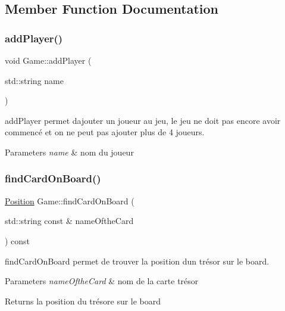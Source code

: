 \subsection{Member Function Documentation}
\mbox{\label{class_game_a99198ff9faa792eeea8b24435e34cd6d}} 
\subsubsection{\texorpdfstring{addPlayer()}{addPlayer()}}
{\footnotesize\ttfamily void Game\+::add\+Player (\begin{DoxyParamCaption}\item[{std\+::string}]{name }\end{DoxyParamCaption})}



add\+Player permet d\textquotesingle{}ajouter un joueur au jeu, le jeu ne doit pas encore avoir commencé et on ne peut pas ajouter plus de 4 joueurs. 


\begin{DoxyParams}{Parameters}
{\em name} & nom du joueur \\
\hline
\end{DoxyParams}
\mbox{\label{class_game_a5d8355f24fa21135389876710cf8cbf3}} 
\subsubsection{\texorpdfstring{findCardOnBoard()}{findCardOnBoard()}}
{\footnotesize\ttfamily \mbox{\hyperlink{class_position}{Position}} Game\+::find\+Card\+On\+Board (\begin{DoxyParamCaption}\item[{std\+::string const \&}]{name\+Ofthe\+Card }\end{DoxyParamCaption}) const\hspace{0.3cm}{\ttfamily [inline]}}



find\+Card\+On\+Board permet de trouver la position d\textquotesingle{}un trésor sur le board. 


\begin{DoxyParams}{Parameters}
{\em name\+Ofthe\+Card} & nom de la carte trésor \\
\hline
\end{DoxyParams}
\begin{DoxyReturn}{Returns}
la position du trésore sur le board 
\end{DoxyReturn}
\mbox{\label{class_game_a0df3fa77221ce465d013d4faf08c0a84}} 
